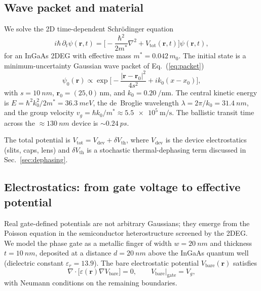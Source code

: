 \documentclass[11pt,a4paper]{article}
\begin{document}
\subsection{Wave packet and material}
\label{sec:packet}

We solve the 2D time-dependent Schr\"odinger equation
\begin{equation}
i\hbar\,\partial_t\psi(\mathbf{r},t) = \Big[-\frac{\hbar^2}{2m^*}\nabla^2 +
V_{\text{tot}}(\mathbf{r},t)\Big]\psi(\mathbf{r},t),
\label{eq:schr}
\end{equation}
for an InGaAs 2DEG with effective mass $m^* = 0.042\,m_0$. The initial state 
is a minimum-uncertainty Gaussian wave packet of Eq.~(\ref{eq:packet})
\begin{equation}
\psi_0(\mathbf{r}) \propto \exp\!\Big[-\frac{|\mathbf{r}-\mathbf{r}_0|^2}{4s^2}
+ i k_0 (x-x_0)\Big],
\label{eq:packet}
\end{equation}
with $s = \SI{10}{nm}$, $\mathbf{r}_0 = (25,0)\,\text{nm}$, and 
$k_0 = \SI{0.20}{\per\nano\meter}$. The central kinetic energy is 
$E = \hbar^2 k_0^2/2m^* = \SI{36.3}{meV}$, the de~Broglie wavelength 
$\lambda = 2\pi/k_0 = \SI{31.4}{nm}$, and the group velocity 
$v_g = \hbar k_0/m^* \approx \SI{5.5e5}{\meter\per\second}$. The ballistic transit time 
across the $\approx\SI{130}{nm}$ device is $\sim\SI{0.24}{ps}$.

The total potential is $V_{\text{tot}} = V_{\text{dev}} + \delta V_{\text{th}}$, 
where $V_{\text{dev}}$ is the device electrostatics (slits, caps, lens) and 
$\delta V_{\text{th}}$ is a stochastic thermal-dephasing term discussed in 
Sec.~\ref{sec:dephasing}.

\subsection{Electrostatics: from gate voltage to effective potential}
\label{sec:electrostatics}

Real gate-defined potentials are not arbitrary Gaussians; they emerge from the 
Poisson equation in the semiconductor heterostructure screened by the 2DEG. 
We model the phase gate as a metallic finger of width $w=\SI{20}{nm}$ and 
thickness $t=\SI{10}{nm}$, deposited at a distance $d=\SI{20}{nm}$ above the 
InGaAs quantum well (dielectric constant $\varepsilon_r=13.9$). The bare 
electrostatic potential $V_{\text{bare}}(\mathbf{r})$ satisfies
\begin{equation}
\nabla\cdot\big[\varepsilon(\mathbf{r})\nabla V_{\text{bare}}\big] = 0,
\qquad V_{\text{bare}}\big|_{\text{gate}} = V_g,
\label{eq:poisson}
\end{equation}
with Neumann conditions on the remaining boundaries.
\end{document}
